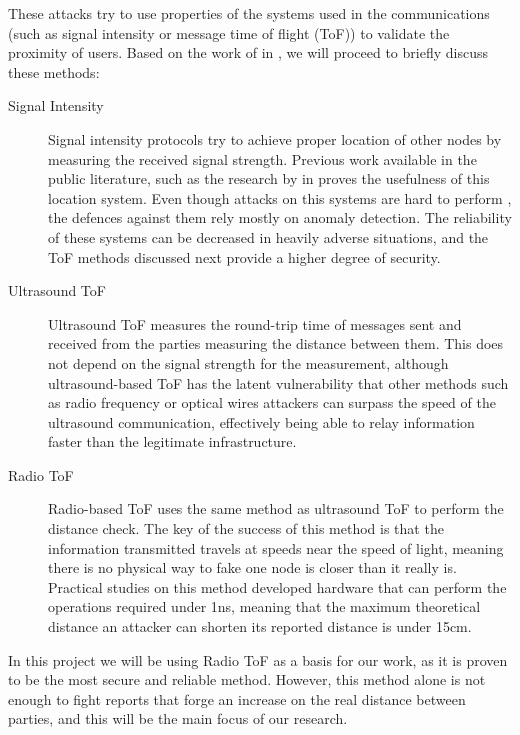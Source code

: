 \documentclass{article}
\begin{document}
These attacks try to use properties of the systems used in the communications (such as signal intensity or message time of flight (ToF)) to validate the proximity of users. Based on the work of \citeauthor{capkun2006secure} in \cite{capkun2006secure}, we will proceed to briefly discuss these methods:

\begin{description}
  \item[Signal Intensity] Signal intensity protocols try to achieve proper location of other nodes by measuring the received signal strength. Previous work available in the public literature, such as the research by \citeauthor{seshadri2005bayesian} in \cite{seshadri2005bayesian} proves the usefulness of this location system. Even though attacks on this systems are hard to perform \cite{sheng2008detecting}, the defences against them rely mostly on anomaly detection. The reliability of these systems can be decreased in heavily adverse situations, and the ToF methods discussed next provide a higher degree of security.
  \item[Ultrasound ToF] Ultrasound ToF measures the round-trip time of messages sent and received from the parties measuring the distance between them. This does not depend on the signal strength for the measurement, although ultrasound-based ToF has the latent vulnerability that other methods such as radio frequency or optical wires attackers can surpass the speed of the ultrasound communication, effectively being able to relay information faster than the legitimate infrastructure.
  \item[Radio ToF] Radio-based ToF uses the same method as ultrasound ToF to perform the distance check. The key of the success of this method is that the information transmitted travels at speeds near the speed of light, meaning there is no physical way to fake one node is closer than it really is. Practical studies on this method \cite{rasmussen2010realization} developed hardware that can perform the operations required under 1ns, meaning that the maximum theoretical distance an attacker can shorten its reported distance is under 15cm.
\end{description}

In this project we will be using Radio ToF as a basis for our work, as it is proven to be the most secure and reliable method. However, this method alone is not enough to fight reports that forge an increase on the real distance between parties, and this will be the main focus of our research.
\end{document}
